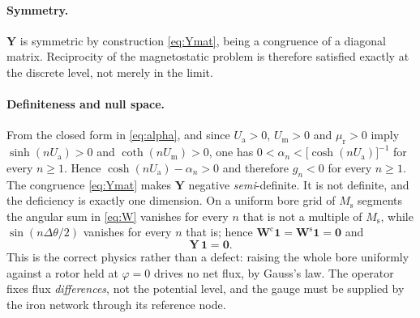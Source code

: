 \documentclass[10pt,a4paper,twocolumn]{article}
\newcommand{\murec}{\mu_{\mathrm{r}}}
\newcommand{\Ua}{U_{\mathrm{a}}}
\newcommand{\Um}{U_{\mathrm{m}}}
\theoremstyle{plain}
\theoremstyle{remark}
\begin{document}
\paragraph{Symmetry.}
$\bm{Y}$ is symmetric by construction \eqref{eq:Ymat}, being a
congruence of a diagonal matrix. Reciprocity of the magnetostatic
problem is therefore satisfied exactly at the discrete level, not merely
in the limit.

\paragraph{Definiteness and null space.}
From the closed form in \eqref{eq:alpha}, and since $\Ua>0$, $\Um>0$ and
$\murec>0$ imply $\sinh(n\Ua)>0$ and $\coth(n\Um)>0$, one has
$0<\alpha_n<\big[\cosh(n\Ua)\big]^{-1}$ for every $n\ge1$. Hence
$\cosh(n\Ua)-\alpha_n>0$ and therefore $g_n<0$ for every $n\ge1$. The
congruence \eqref{eq:Ymat} makes $\bm{Y}$ negative
\emph{semi}-definite. It is not definite, and the deficiency is exactly
one dimension. On a uniform bore grid of $M_{\mathrm{s}}$ segments the
angular sum in \eqref{eq:W} vanishes for every $n$ that is not a
multiple of $M_{\mathrm{s}}$, while $\sin(n\Delta\theta/2)$ vanishes for
every $n$ that is; hence $\bm{W}^{\mathrm{c}}\bm{1} =
\bm{W}^{\mathrm{s}}\bm{1} = \bm{0}$ and
\begin{equation}
\bm{Y}\,\bm{1} = \bm{0} .
\label{eq:nullspace}
\end{equation}
This is the correct physics rather than a defect: raising the whole bore
uniformly against a rotor held at $\varphi=0$ drives no net flux, by
Gauss's law. The operator fixes flux \emph{differences}, not the
potential level, and the gauge must be supplied by the iron network
through its reference node.
\end{document}
